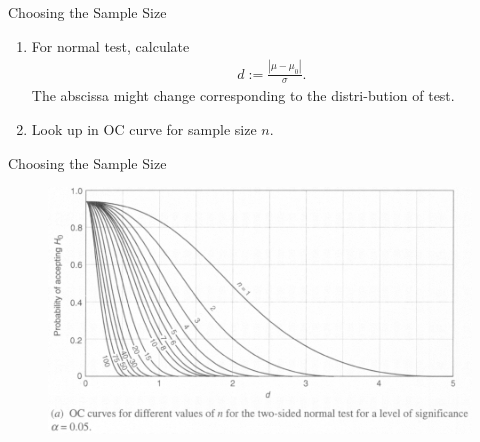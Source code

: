 \begin{frame}{Choosing the Sample Size}

\begin{enumerate}
	\justifying
	\item For normal test, calculate
	\begin{align*}
	d := \frac{|\mu - \mu_0|}{\sigma}.
	\end{align*}
	 The abscissa might change corresponding to the distri-bution of test.
	\item Look up in OC curve for sample size $n$.
\end{enumerate}

\end{frame}


\begin{frame}{Choosing the Sample Size}

\begin{figure}[htbp]
	\centering
	\includegraphics[width=\linewidth]{./images/rc5fig3.png}
\end{figure}

\end{frame}


